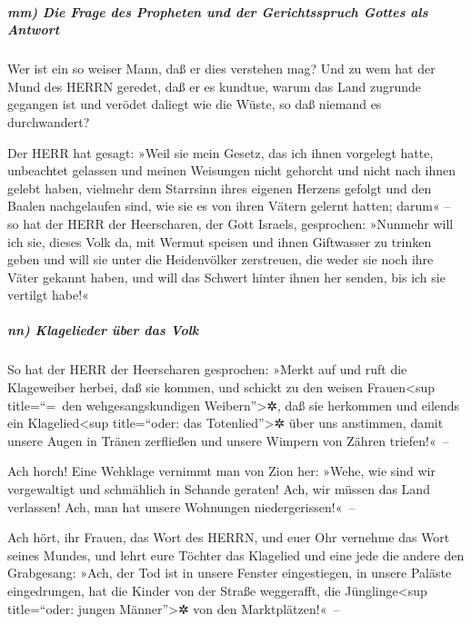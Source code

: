 \hypertarget{mm-die-frage-des-propheten-und-der-gerichtsspruch-gottes-als-antwort}{%
\subparagraph{mm) Die Frage des Propheten und der Gerichtsspruch Gottes
als
Antwort}\label{mm-die-frage-des-propheten-und-der-gerichtsspruch-gottes-als-antwort}}

Wer ist ein so weiser Mann, daß er dies verstehen mag?
Und zu wem hat der Mund des HERRN geredet, daß er es kundtue, warum das
Land zugrunde gegangen ist und verödet daliegt wie die Wüste, so daß
niemand es durchwandert?

Der HERR hat gesagt: »Weil sie mein Gesetz, das ich ihnen
vorgelegt hatte, unbeachtet gelassen und meinen Weisungen nicht gehorcht
und nicht nach ihnen gelebt haben, vielmehr dem Starrsinn
ihres eigenen Herzens gefolgt und den Baalen nachgelaufen sind, wie sie
es von ihren Vätern gelernt hatten; darum« -- so hat der
HERR der Heerscharen, der Gott Israels, gesprochen: »Nunmehr will ich
sie, dieses Volk da, mit Wermut speisen und ihnen Giftwasser zu trinken
geben und will sie unter die Heidenvölker zerstreuen, die
weder sie noch ihre Väter gekannt haben, und will das Schwert hinter
ihnen her senden, bis ich sie vertilgt habe!«

\hypertarget{nn-klagelieder-uxfcber-das-volk}{%
\subparagraph{nn) Klagelieder über das
Volk}\label{nn-klagelieder-uxfcber-das-volk}}

So hat der HERR der Heerscharen gesprochen: »Merkt auf
und ruft die Klageweiber herbei, daß sie kommen, und schickt zu den
weisen Frauen\textless sup title=``=~den wehgesangskundigen
Weibern''\textgreater✲, daß sie herkommen und eilends ein
Klagelied\textless sup title=``oder: das Totenlied''\textgreater✲ über
uns anstimmen, damit unsere Augen in Tränen zerfließen und unsere
Wimpern von Zähren triefen!«~--

Ach horch! Eine Wehklage vernimmt man von Zion her:
»Wehe, wie sind wir vergewaltigt und schmählich in Schande geraten! Ach,
wir müssen das Land verlassen! Ach, man hat unsere Wohnungen
niedergerissen!«~--

Ach hört, ihr Frauen, das Wort des HERRN, und euer Ohr
vernehme das Wort seines Mundes, und lehrt eure Töchter das Klagelied
und eine jede die andere den Grabgesang: »Ach, der Tod
ist in unsere Fenster eingestiegen, in unsere Paläste eingedrungen, hat
die Kinder von der Straße weggerafft, die Jünglinge\textless sup
title=``oder: jungen Männer''\textgreater✲ von den Marktplätzen!«~--

